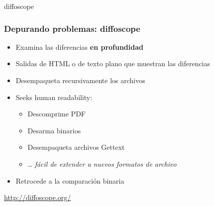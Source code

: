 \documentclass[14pt,aspectratio=169]{beamer}
\begin{document}
\begin{frame}[plain]
\end{frame}

{
\begin{frame}{diffoscope}
 \frametitle{Depurando problemas: diffoscope}

 \begin{itemize}
  \item Examina las diferencias \textbf{en profundidad}
  \item Salidas de HTML o de texto plano que muestran las diferencias
  \item Desempaqueta recursivamente los archivos
  \item Seeks human readability:
   \begin{itemize}
    \item Descomprime PDF
    \item Desarma binarios
    \item Desempaqueta archivos Gettext
    \item … \textit{fácil de extender a nuevos formatos de archivo}
   \end{itemize}
  \item Retrocede a la comparación binaria
 \end{itemize}
 \vfill
 \begin{center}
  \url{http://diffoscope.org/}\\
  {\footnotesize {}}
 \end{center}
\end{frame}
}
\end{document}
